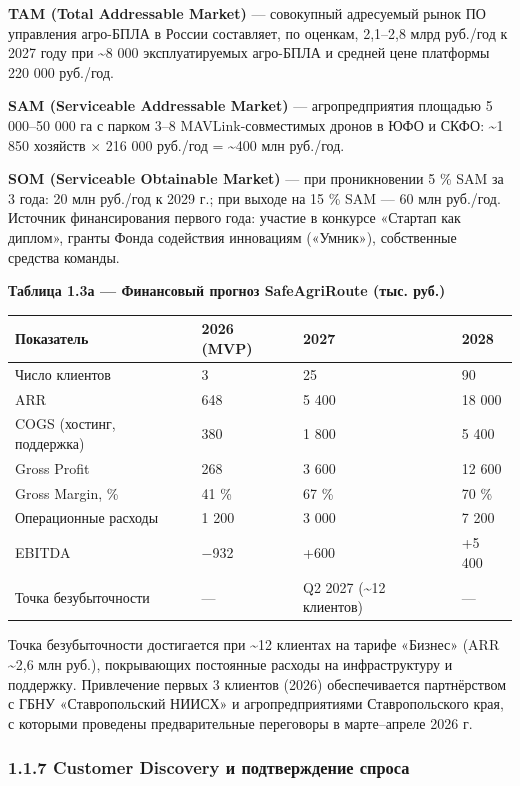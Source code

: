 \textbf{TAM (Total Addressable Market)} --- совокупный адресуемый рынок ПО управления агро-БПЛА в России составляет, по оценкам, 2,1--2,8 млрд руб./год к 2027 году при \textasciitilde8 000 эксплуатируемых агро-БПЛА и средней цене платформы 220 000 руб./год.

\textbf{SAM (Serviceable Addressable Market)} --- агропредприятия площадью 5 000--50 000 га с парком 3--8 MAVLink-совместимых дронов в ЮФО и СКФО: \textasciitilde1 850 хозяйств × 216 000 руб./год = \textasciitilde400 млн руб./год.

\textbf{SOM (Serviceable Obtainable Market)} --- при проникновении 5 \% SAM за 3 года: 20 млн руб./год к 2029 г.; при выходе на 15 \% SAM --- 60 млн руб./год. Источник финансирования первого года: участие в конкурсе «Стартап как диплом», гранты Фонда содействия инновациям («Умник»), собственные средства команды.

\textbf{Таблица 1.3а --- Финансовый прогноз SafeAgriRoute (тыс. руб.)}

\begin{longtable}[]{@{}llll@{}}
\toprule\noalign{}
Показатель & 2026 (MVP) & 2027 & 2028 \\
\midrule\noalign{}
\endhead
\bottomrule\noalign{}
\endlastfoot
Число клиентов & 3 & 25 & 90 \\
ARR & 648 & 5 400 & 18 000 \\
COGS (хостинг, поддержка) & 380 & 1 800 & 5 400 \\
Gross Profit & 268 & 3 600 & 12 600 \\
Gross Margin, \% & 41 \% & 67 \% & 70 \% \\
Операционные расходы & 1 200 & 3 000 & 7 200 \\
EBITDA & −932 & +600 & +5 400 \\
Точка безубыточности & --- & Q2 2027 (\textasciitilde12 клиентов) & --- \\
\end{longtable}

Точка безубыточности достигается при \textasciitilde12 клиентах на тарифе «Бизнес» (ARR \textasciitilde2,6 млн руб.), покрывающих постоянные расходы на инфраструктуру и поддержку. Привлечение первых 3 клиентов (2026) обеспечивается партнёрством с ГБНУ «Ставропольский НИИСХ» и агропредприятиями Ставропольского края, с которыми проведены предварительные переговоры в марте--апреле 2026 г.

\hypertarget{customer-discovery-ux438-ux43fux43eux434ux442ux432ux435ux440ux436ux434ux435ux43dux438ux435-ux441ux43fux440ux43eux441ux430}{%
\subsubsection{1.1.7 Customer Discovery и подтверждение спроса}\label{customer-discovery-ux438-ux43fux43eux434ux442ux432ux435ux440ux436ux434ux435ux43dux438ux435-ux441ux43fux440ux43eux441ux430}}

